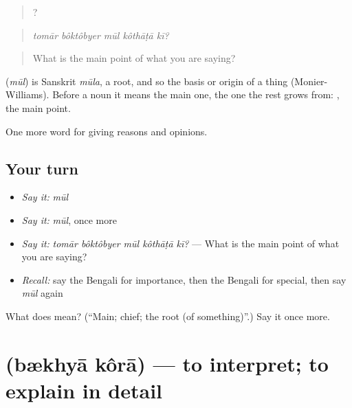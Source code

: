 \begin{quote}
    ?
\end{quote}

\begin{quote}
\emph{tomār bôktôbyer mūl kôthāṭā kī?}
\end{quote}

\begin{quote}
What is the main point of what you are saying?
\end{quote}

\begin{cousinweb}
\textbf{} (\emph{mūl}) is Sanskrit \emph{mūla}, a root, and so the basis or origin of a thing (Monier-Williams). Before a noun it means the main one, the one the rest grows from:  , the main point.
\end{cousinweb}

\begin{grammarlens}[title={What you've built}]
One more word for giving reasons and opinions.
\end{grammarlens}

\subsection*{Your turn}
\begin{itemize}
\raggedright
  \item \emph{Say it:} \emph{mūl}
  \item \emph{Say it:} \emph{mūl}, once more
  \item \emph{Say it:} \emph{tomār bôktôbyer mūl kôthāṭā kī?} — What is the main point of what you are saying?
  \item \emph{Recall:} say the Bengali for importance, then the Bengali for special, then say \emph{mūl} again
\end{itemize}

\begin{tcolorbox}[breakable,colback=teal!4,colframe=teal!35!black,title={Before you move on}]
What does  mean? (\textquotedblleft{}Main; chief; the root (of something)\textquotedblright{}.) Say it once more.
\end{tcolorbox}
\section[\texorpdfstring{\bn{ব্যাখ্যা} \bn{করা} (bækhyā kôrā)}{ব্যাখ্যা করা (bækhyā kôrā)}]{  (bækhyā kôrā) — to interpret; to explain in detail}

